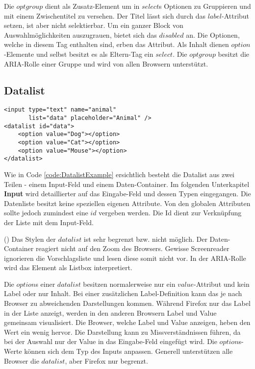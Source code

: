 Die $optgroup$ dient als Zusatz-Element um in $select$s Optionen zu Gruppieren und mit einem Zwischentitel zu versehen.
Der Titel lässt sich durch das $label$-Attribut setzen, ist aber nicht selektierbar. 
Um ein ganzer Block von Auswahlmöglichkeiten auszugrauen, bietet sich das $disabled$ an.
Die Optionen, welche in diesem Tag enthalten sind, erben das Attribut.
Als Inhalt dienen $option$-Elemente und selbst besitzt es als Eltern-Tag ein $select$.
Die $optgroup$ besitzt die ARIA-Rolle einer Gruppe und wird von allen Browsern unterstützt.


\subsection{Datalist}

\begin{lstlisting}[style = htmlcssjs, caption = Datalist Example, label = code:DatalistExample]
<input type="text" name="animal" 
       list="data" placeholder="Animal" />
<datalist id="data">
    <option value="Dog"></option>
    <option value="Cat"></option>
    <option value="Mouse"></option>
</datalist>
\end{lstlisting}

Wie in Code \ref{code:DatalistExample} ersichtlich besteht die Datalist aus zwei Teilen - einem Input-Feld und einem Daten-Container. 
Im folgenden Unterkapitel \textbf{Input} wird detaillierter auf das Eingabe-Feld und dessen Typen eingegangen.
Die Datenliste besitzt keine speziellen eigenen Attribute.
Von den globalen Attributen sollte jedoch zumindest eine $id$ vergeben werden.
Die Id dient zur Verknüpfung der Liste mit dem Input-Feld. 

(\cite{datalistMdn}) Das Stylen der $datalist$ ist sehr begrenzt bzw. nicht möglich. 
Der Daten-Container reagiert nicht auf den Zoom des Browsers.
Gewisse Screenreader ignorieren die Vorschlagsliste und lesen diese somit nicht vor.
In der ARIA-Rolle wird das Element als Listbox interpretiert.

Die $option$s einer $datalist$ besitzen normalerweise nur ein $value$-Attribut und kein Label oder nur Inhalt.
Bei einer zusätzlichen Label-Definition kann das je nach Browser zu abweichenden Darstellungen kommen. 
Während Firefox nur das Label in der Liste anzeigt, werden in den anderen Browsern Label und Value gemeinsam visualisiert. 
Die Browser, welche Label und Value anzeigen, heben den Wert ein wenig hervor.
Die Darstellung kann zu Missverständnissen führen, da bei der Auswahl nur der Value in das Eingabe-Feld eingefügt wird. 
Die $option$s-Werte können sich dem Typ des Inputs anpassen. 
Generell unterstützen alle Browser die $datalist$, aber Firefox nur begrenzt.

